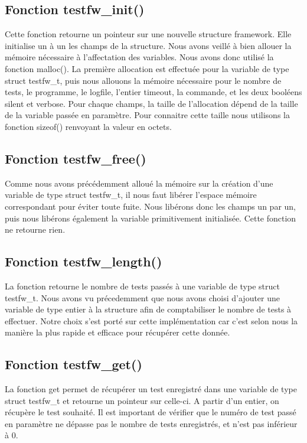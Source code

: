 \documentclass{article}
\begin{document}
\subsection{Fonction testfw\_init()}
Cette fonction retourne un pointeur sur une nouvelle structure framework. Elle initialise un à un les champs de la structure. Nous avons veillé à bien allouer la mémoire nécessaire à l'affectation des variables. Nous avons donc utilisé la fonction malloc(). La première allocation est effectuée pour la variable de type struct testfw\_t, puis nous allouons la mémoire nécessaire pour le nombre de tests, le programme, le logfile, l'entier timeout, la commande, et les deux booléens silent et verbose. Pour chaque champs, la taille de l'allocation dépend de la taille de la variable passée en paramètre. Pour connaitre cette taille nous utilisons la fonction sizeof() renvoyant la valeur en octets. 


\subsection{Fonction testfw\_free()}

Comme nous avons précédemment alloué la mémoire sur la création d'une variable de type struct testfw\_t, il nous faut libérer l'espace mémoire correspondant pour éviter toute fuite. Nous libérons donc les champs un par un, puis nous libérons également la variable primitivement initialisée. Cette fonction ne retourne rien.


\subsection{Fonction testfw\_length()}
La fonction retourne le nombre de tests passés à une variable de type struct testfw\_t. Nous avons vu précedemment que nous avons choisi d'ajouter une variable de type entier à la structure afin de comptabiliser le nombre de tests à effectuer. Notre choix s'est porté sur cette implémentation car c'est selon nous la manière la plus rapide et efficace pour récupérer cette donnée.

\subsection{Fonction testfw\_get()}
La fonction get permet de récupérer un test enregistré dans une variable de type struct testfw\_t et retourne un pointeur sur celle-ci.  A partir d'un entier, on récupère le test souhaité. Il est important de vérifier que le numéro de test passé en paramètre ne dépasse pas le nombre de tests enregistrés, et n'est pas inférieur à 0. 
\end{document}
